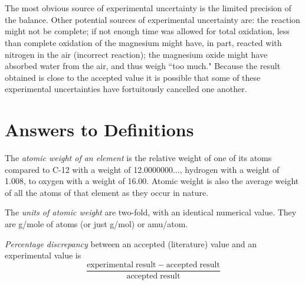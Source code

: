 \documentclass{article}
\begin{document}
\section{}


The most obvious source of experimental uncertainty is the limited precision of the balance. Other potential sources of experimental uncertainty are: the reaction might not be complete; if not enough time was allowed for total oxidation, less than complete oxidation of the magnesium might have, in part, reacted with nitrogen in the air (incorrect reaction); the magnesium oxide might have absorbed water from the air, and thus weigh ``too much." Because the result obtained is close to the accepted value it is possible that some of these experimental uncertainties have fortuitously cancelled one another.


\section{Answers to Definitions}

\begin{enumerate}
\begin{item}
The \emph{atomic weight of an element} is the relative weight of one of its atoms compared to C-12 with a weight of 12.0000000$\ldots$, hydrogen with a weight of 1.008, to oxygen with a weight of 16.00. Atomic weight is also the average weight of all the atoms of that element as they occur in nature.
\end{item}
\begin{item}
The \emph{units of atomic weight} are two-fold, with an identical numerical value. They are g/mole of atoms (or just g/mol) or amu/atom.
\end{item}
\begin{item}
\emph{Percentage discrepancy} between an accepted (literature) value and an experimental value is
\begin{equation*}
\frac{\mathrm{experimental\;result} - \mathrm{accepted\;result}}{\mathrm{accepted\;result}}
\end{equation*}
\end{item}
\end{enumerate}

\end{document}

